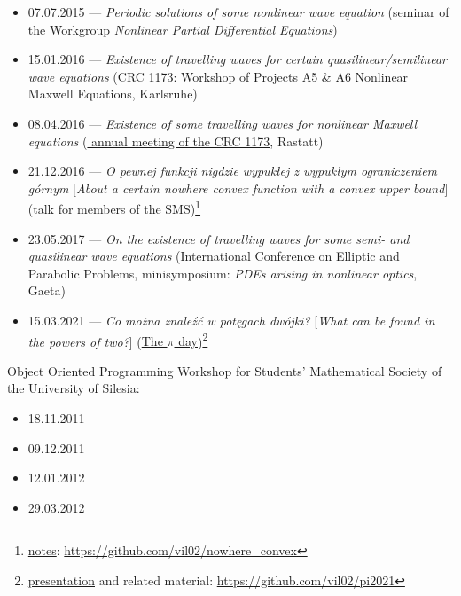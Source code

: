 \begin{itemize}
  \item 07.07.2015 --- \textsl{Periodic solutions of some nonlinear wave equation} (seminar of the Workgroup \textit{Nonlinear Partial Differential Equations})
  \item 15.01.2016 --- \textsl{Existence of travelling waves for certain quasilinear/semilinear wave equations} (CRC 1173: Workshop of Projects A5 \& A6 Nonlinear Maxwell Equations, Karlsruhe)
  \item 08.04.2016 --- \textsl{Existence of some travelling waves for nonlinear Maxwell equations} (\href{\urlFirstAnnualCrc}{ annual meeting of the CRC 1173}, Rastatt)
  \item 21.12.2016 --- \textsl{O pewnej funkcji nigdzie wypukłej z wypukłym ograniczeniem górnym} [\textsl{About a certain nowhere convex function with a convex upper bound}] (talk for members of the SMS)\footnote{\href{https://raw.githubusercontent.com/vil02/nowhere_convex/master/generated/nowhere_convex.pdf}{notes}: \url{https://github.com/vil02/nowhere_convex}}
  \item 23.05.2017 --- \textsl{On the existence of travelling waves for some semi- and quasilinear wave equations} (International Conference on Elliptic and Parabolic Problems, minisymposium: \textit{PDEs arising in nonlinear optics}, Gaeta)
  \item 15.03.2021 --- \textsl{Co można znaleźć w potęgach dwójki?} [\textsl{What can be found in the powers of two?}] (\href{\urlPiXV}{The $\pi$ day})\footnote{\href{https://raw.githubusercontent.com/vil02/pi2021/master/generated/pi2021.pdf}{presentation} and related material: \url{https://github.com/vil02/pi2021}}
\end{itemize}
\noindent Object Oriented Programming Workshop for Students' Mathematical Society of the University of Silesia:
\begin{itemize}
  \item 18.11.2011
  \item 09.12.2011
  \item 12.01.2012
  \item 29.03.2012
\end{itemize}
